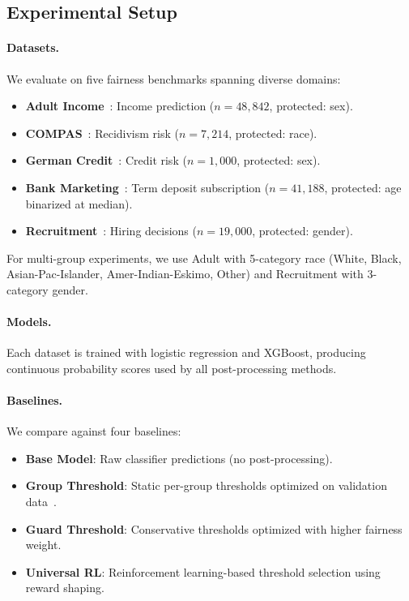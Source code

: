 \documentclass[10pt,twocolumn]{article}
\theoremstyle{definition}
\begin{document}
\subsection{Experimental Setup}

\paragraph{Datasets.} We evaluate on five fairness benchmarks spanning diverse domains:
\begin{itemize}
    \item \textbf{Adult Income}~\cite{dua2019uci}: Income prediction ($n=48{,}842$, protected: sex).
    \item \textbf{COMPAS}~\cite{angwin2016machine}: Recidivism risk ($n=7{,}214$, protected: race).
    \item \textbf{German Credit}~\cite{dua2019uci}: Credit risk ($n=1{,}000$, protected: sex).
    \item \textbf{Bank Marketing}~\cite{moro2014data}: Term deposit subscription ($n=41{,}188$, protected: age binarized at median).
    \item \textbf{Recruitment}~\cite{recruitment2023}: Hiring decisions ($n=19{,}000$, protected: gender).
\end{itemize}
For multi-group experiments, we use Adult with 5-category race (White, Black, Asian-Pac-Islander, Amer-Indian-Eskimo, Other) and Recruitment with 3-category gender.

\paragraph{Models.} Each dataset is trained with logistic regression and XGBoost, producing continuous probability scores used by all post-processing methods.

\paragraph{Baselines.} We compare against four baselines:
\begin{itemize}
    \item \textbf{Base Model}: Raw classifier predictions (no post-processing).
    \item \textbf{Group Threshold}: Static per-group thresholds optimized on validation data~\cite{hardt2016equality}.
    \item \textbf{Guard Threshold}: Conservative thresholds optimized with higher fairness weight.
    \item \textbf{Universal RL}: Reinforcement learning-based threshold selection using reward shaping.
\end{itemize}
\end{document}
